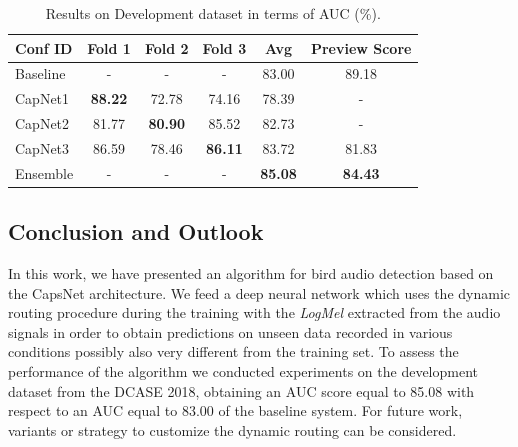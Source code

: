 \begin{table}[t]
	\centering
	\begin{tabular}{|l|c|c|c|c|c|}
		\hline
		Conf ID & Fold 1 & Fold 2	& Fold 3 & Avg & Preview Score \\
		\hline
		Baseline &	-	&	-		&	-	& 83.00 &  89.18		\\
		\hline
		CapNet1	&  \textbf{88.22} & 72.78	& 74.16	& 78.39 & -	\\
		CapNet2	&  81.77 &  \textbf{80.90} 	& 85.52	& 82.73	& 	- \\
		CapNet3	&  86.59 & 78.46	&  \textbf{86.11}	&  83.72 				& 81.83  \\
		Ensemble &	-	 & 		-	&		-			&		\textbf{85.08}  & \textbf{84.43} \\
		\hline		
	\end{tabular}
	\caption[CapsNet for Bird Audio Detection - Results]{Results on Development dataset in terms of AUC (\%).}
	\label{tab:results}
\end{table}


\subsection{Conclusion and Outlook}
\label{sec:conclusion}

In this work, we have presented an algorithm for bird audio detection based on the CapsNet architecture. We feed a deep neural network which uses the dynamic routing procedure during the training with the \textit{LogMel} extracted from the audio signals in order to obtain predictions on unseen data recorded in various conditions possibly also very different from the training set. 
To assess the performance of the algorithm we conducted experiments on the development dataset from the DCASE 2018, obtaining an AUC score equal to 85.08 with respect to an AUC equal to 83.00 of the baseline system.
For future work, variants \cite{hinton2018matrix} or strategy to customize the dynamic routing can be considered.

